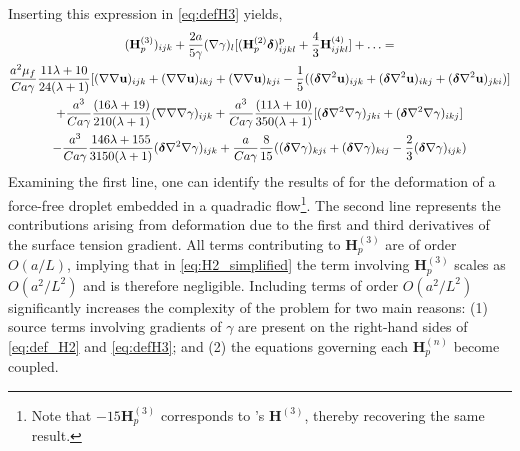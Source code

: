 Inserting this expression in \ref{eq:defH3} yields, 
\begin{multline}
    (\textbf{H}_p^{(3)})_{ijk}
    +
    \frac{2a}{5\gamma}(\mathbf{\nabla} \gamma)_l[  
    (\textbf{H}_p^{(2)}\bm\delta)^\text{p}_{ijkl}
    +
    \frac{4}{3} \textbf{H}^{(4)}_{ijkl}]
    +\ldots
    =\\
    \frac{a^2 \mu_f }{Ca\gamma}\frac{11\lambda+10}{24(\lambda+1)} [
        (\mathbf{\nabla} \mathbf{\nabla} \textbf{u})_{ijk}
        +(\mathbf{\nabla} \mathbf{\nabla} \textbf{u})_{ikj}
        +(\mathbf{\nabla} \mathbf{\nabla} \textbf{u})_{kji}
        - \frac{1}{5}(
            (\bm\delta \mathbf{\nabla}^2 \textbf{u})_{ijk}
            + (\bm\delta \mathbf{\nabla}^2 \textbf{u})_{ikj}
            + (\bm\delta \mathbf{\nabla}^2 \textbf{u})_{jki}
        )
        ]
    \\
    +\frac{a^3 }{Ca\gamma}\frac{(16\lambda +19)}{210(\lambda+1)}(\mathbf{\nabla}\mathbf{\nabla}\mathbf{\nabla}\gamma)_{ijk}
    +\frac{a^3 }{Ca\gamma}\frac{(11\lambda +10)}{350(\lambda+1)}
    [(\bm\delta \mathbf{\nabla}^2\mathbf{\nabla} \gamma)_{jki}+ (\bm\delta \mathbf{\nabla}^2\mathbf{\nabla} \gamma)_{ikj}]\\
    - \frac{a^3 }{Ca\gamma} \frac{146\lambda +155}{3150(\lambda+1)}(\bm\delta \mathbf{\nabla}^2\mathbf{\nabla} \gamma)_{ijk}
    +\frac{a}{Ca \gamma} \frac{8}{15}(
        (\bm\delta \mathbf{\nabla}\gamma)_{kji}
        + (\bm\delta \mathbf{\nabla}\gamma)_{kij}
        -\frac{2}{3}(\bm\delta \mathbf{\nabla}\gamma)_{ijk}
    )
\end{multline} 
Examining the first line, one can identify the results of \citet{nadim1991motion} for the deformation of a force-free droplet embedded in a quadradic flow\footnote{Note that $- 15 \textbf{H}_p^{(3)}$  corresponds to \citet{nadim1991motion}'s $\textbf{H}^{(3)}$, thereby recovering the same result.}.  
The second line represents the contributions arising from deformation due to the first and third derivatives of the surface tension gradient.
All terms contributing to $\textbf{H}_p^{(3)}$ are of order  $O(a/L)$, implying that in \ref{eq:H2_simplified} the term involving $\textbf{H}_p^{(3)}$ scales as $O(a^2/L^2)$ and is therefore negligible. %
 Including terms of order $O(a^2/L^2)$ significantly increases the complexity of the problem for two main reasons: (1) source terms involving gradients of $\gamma$ are present on the right-hand sides of \ref{eq:def_H2} and \ref{eq:defH3}; and (2) the equations governing each $\textbf{H}_p^{(n)}$ become coupled. 

